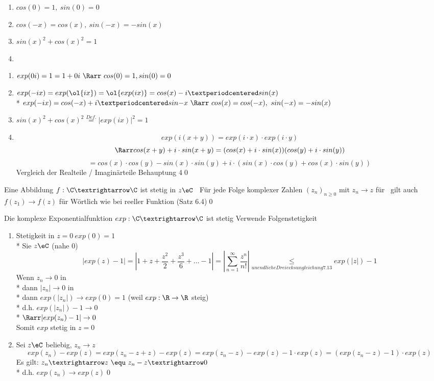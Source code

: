 \begin{enumerate}
\item{$cos(0)=1,\ sin(0)=0$}
\item{$cos(-x)=cos(x),\ sin(-x)=-sin(x)$}
\item{$sin(x)^2+cos(x)^2=1$}
\item{}
\end{enumerate}
\bew
\begin{enumerate}
\item{$exp(0i)=1=1+0i\ \Rarr\ cos(0)=1, sin(0)=0$}
\item{$exp(-ix)=exp(\ol{ix})=\ol{exp(ix)}=cos(x)-i·sin(x)$\\*
$exp(-ix)=cos(-x)+i·sin{-x}\ \Rarr\ cos(x)=cos(-x),\ sin(-x)=-sin(x)$}
\item{$sin(x)^2+cos(x)^2\overset{Def.}{=}|exp(ix)|^2=1$}
\item{$$exp(i(x+y)) = exp(i \cdot x) \cdot exp(i \cdot y)$$
$$\Rarr cos(x+y) + i \cdot sin(x+y) = (cos(x) + i \cdot sin(x))(cos(y) + i \cdot sin(y))$$
$$=cos(x) \cdot cos(y) - sin(x) \cdot sin(y) + i \cdot (sin(x) \cdot cos(y) + cos(x) \cdot sin(y))$$
Vergleich der Realteile / Imaginärteile \Rarr{} Behauptung 4\qed}
\end{enumerate}


Eine Abbildung $f:\C→\C$ ist stetig in $z\eC$ \equ\ Für jede Folge komplexer Zahlen $(z_n)_{n\geq 0}$ mit $z_n→z$ für \nif\ gilt auch $f(z_1)→f(z)$ für \nif
\bew
Wörtlich wie bei reeller Funktion (Satz 6.4)\qed

Die komplexe Exponentialfunktion $exp:\C→\C$ ist stetig
\bew
Verwende Folgenstetigkeit
\begin{enumerate}
\item{Stetigkeit in $z=0\ exp (0)=1$\\*
Sie $z\eC$ (nahe 0)
$$\left|exp(z)-1\right|=\left|1+z+\frac{z^2}{2}+\frac{z^3}{6}+…-1\right|=\left|\sum_{n=1}^{∞}\frac{z^n}{n!}\right|\underset{unendliche Dreiecksungleichung 7.13}{\leq}exp(|z|)-1$$
Wenn $z_n→0$ in \C\\*
dann $|z_n|→0$ in \R\\*
dann $exp(|z_n|) \to exp(0) = 1$ (weil $exp: \R \to \R$ steig)\\*
d.h. $exp(|z_n|) -1 \to 0$\\*
$\Rarr|exp(z_n) - 1| \to 0$\\
Somit $exp$ stetig in $z = 0$ }
\item{Sei $z\eC$ beliebig, $z_n→z$
$$exp(z_n)-exp(z)=exp(z_n-z+z)-exp(z)=exp(z_n-z)-exp(z)-1·exp(z)=(exp(z_n-z)-1)·exp(z)$$
Es gilt: $z_n→z\ \equ\ z_n-z→0$\\*
d.h. $exp(z_n)→exp(z)$\qed}
\end{enumerate}


